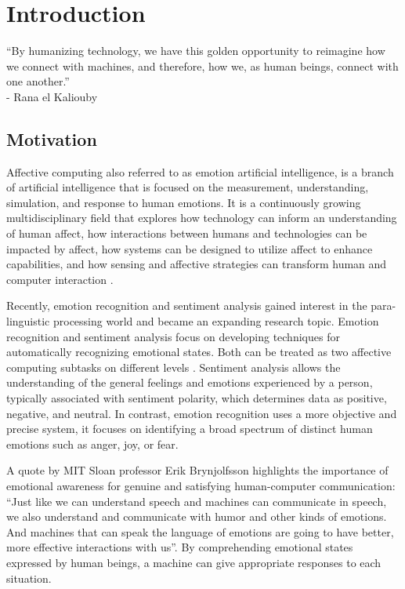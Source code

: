 \chapter{Introduction}
\label{chapter:introduction}

\begin{introduction}
“By humanizing technology, we have this golden opportunity to reimagine how we connect with machines, and therefore, how we, as human beings, connect with one another.”\\- Rana el Kaliouby \cite{ranaTedTalk}
\end{introduction}

\section{Motivation}

Affective computing also referred to as emotion artificial intelligence, is a branch of artificial intelligence that is focused on the measurement, understanding, simulation, and response to human emotions. It is a continuously growing multidisciplinary field that explores how technology can inform an understanding of human affect, how interactions between humans and technologies can be impacted by affect, how systems can be designed to utilize affect to enhance capabilities, and how sensing and affective strategies can transform human and computer interaction \cite{Daily2017}. 

Recently, emotion recognition and sentiment analysis gained interest in the para-linguistic processing world and became an expanding research topic. Emotion recognition and sentiment analysis focus on developing techniques for automatically recognizing emotional states. Both can be treated as two affective computing subtasks on different levels \cite{PORIA201798}. Sentiment analysis allows the understanding of the general feelings and emotions experienced by a person, typically associated with sentiment polarity, which determines data as positive, negative, and neutral. In contrast, emotion recognition uses a more objective and precise system, it focuses on identifying a broad spectrum of distinct human emotions such as anger, joy, or fear.

A quote by MIT Sloan professor Erik Brynjolfsson highlights the importance of emotional awareness for genuine and satisfying human-computer communication: “Just like we can understand speech and machines can communicate in speech, we also understand and communicate with humor and other kinds of emotions. And machines that can speak the language of emotions are going to have better, more effective interactions with us”. By comprehending emotional states expressed by human beings, a machine can give appropriate responses to each situation.


